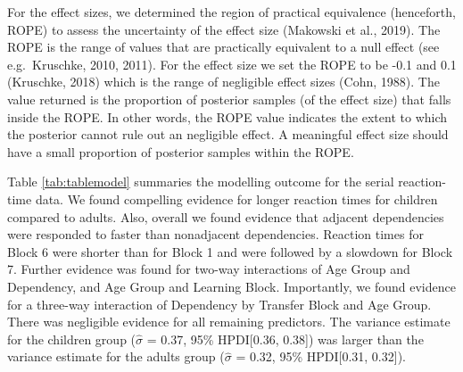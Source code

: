 \documentclass[
  english,
  man,floatsintext]{apa7}
\begin{document}
For the effect sizes, we determined the region of practical equivalence (henceforth, ROPE) to assess the uncertainty of the effect size (Makowski et al., 2019). The ROPE is the range of values that are practically equivalent to a null effect (see e.g.~Kruschke, 2010, 2011). For the effect size we set the ROPE to be -0.1 and 0.1 (Kruschke, 2018) which is the range of negligible effect sizes (Cohn, 1988). The value returned is the proportion of posterior samples (of the effect size) that falls inside the ROPE. In other words, the ROPE value indicates the extent to which the posterior cannot rule out an negligible effect. A meaningful effect size should have a small proportion of posterior samples within the ROPE.

Table \ref{tab:tablemodel} summaries the modelling outcome for the serial reaction-time data. We found compelling evidence for longer reaction times for children compared to adults. Also, overall we found evidence that adjacent dependencies were responded to faster than nonadjacent dependencies. Reaction times for Block 6 were shorter than for Block 1 and were followed by a slowdown for Block 7. Further evidence was found for two-way interactions of Age Group and Dependency, and Age Group and Learning Block. Importantly, we found evidence for a three-way interaction of Dependency by Transfer Block and Age Group. There was negligible evidence for all remaining predictors. The variance estimate for the children group (\(\hat{\sigma}\) = 0.37, 95\% HPDI{[}0.36, 0.38{]}) was larger than the variance estimate for the adults group (\(\hat{\sigma}\) = 0.32, 95\% HPDI{[}0.31, 0.32{]}).
\end{document}
